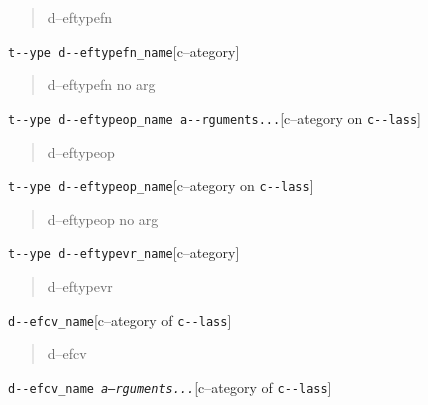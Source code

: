 \documentclass{book}
\begin{document}
%
\begin{quote}
\unskip{\parskip=0pt\noindent}%
d--eftypefn
\end{quote}

\noindent\texttt{t{-}{-}ype d{-}{-}eftypefn\_name}\hfill[c--ategory]



%
\begin{quote}
\unskip{\parskip=0pt\noindent}%
d--eftypefn no arg
\end{quote}

\noindent\texttt{t{-}{-}ype d{-}{-}eftypeop\_name a{-}{-}rguments...}\hfill[c--ategory on \texttt{c{-}{-}lass}]



%
\begin{quote}
\unskip{\parskip=0pt\noindent}%
d--eftypeop
\end{quote}

\noindent\texttt{t{-}{-}ype d{-}{-}eftypeop\_name}\hfill[c--ategory on \texttt{c{-}{-}lass}]



%
\begin{quote}
\unskip{\parskip=0pt\noindent}%
d--eftypeop no arg
\end{quote}

\noindent\texttt{t{-}{-}ype d{-}{-}eftypevr\_name}\hfill[c--ategory]



%
\begin{quote}
\unskip{\parskip=0pt\noindent}%
d--eftypevr
\end{quote}

\noindent\texttt{d{-}{-}efcv\_name}\hfill[c--ategory of \texttt{c{-}{-}lass}]



%
\begin{quote}
\unskip{\parskip=0pt\noindent}%
d--efcv
\end{quote}

\noindent\texttt{d{-}{-}efcv\_name \EmbracOn{}\textnormal{\textsl{a--rguments...}}\EmbracOff{}}\hfill[c--ategory of \texttt{c{-}{-}lass}]
\end{document}
